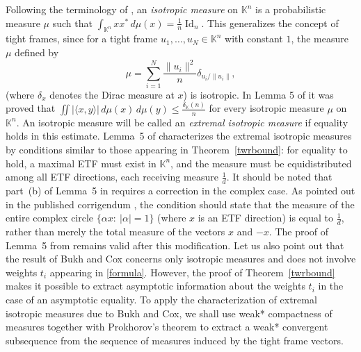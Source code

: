 \documentclass[12pt, reqno]{amsart}
\theoremstyle{definition}
\theoremstyle{remark}
\numberwithin{equation}{section}
\DeclareMathOperator{\id}{Id}
\begin{document}
Following the terminology of \cite{bukhcox}, an \emph{isotropic measure} on $\mathbb{K}^n$ is a probabilistic measure $\mu$ such that $\int_{\mathbb{K}^n} xx^* \,d\mu(x) = \frac{1}{n} \id_n$. This generalizes the concept of tight frames, since for a tight frame $u_1, \ldots, u_N \in \mathbb{K}^n$ with constant $1$, the measure $\mu$ defined by
$$\mu = \sum_{i=1}^{N} \frac{\|u_i\|^2}{n} \delta_{u_i/\|u_i\|},$$
(where $\delta_x$ denotes the Dirac measure at $x$) is isotropic. In Lemma 5 of \cite{bukhcox} it was proved that $\iint |\langle x,y\rangle| \,d\mu(x)\,d\mu(y) \leq \frac{\delta_{\mathbb{K}}(n)}{n}$ for every isotropic measure $\mu$ on $\mathbb{K}^n$. An isotropic measure will be called an \emph{extremal isotropic measure} if equality holds in this estimate. Lemma~5 of \cite{bukhcox} characterizes the extremal isotropic measures by conditions similar to those appearing in Theorem~\ref{twrbound}: for equality to hold, a maximal ETF must exist in $\mathbb K^n$, and the measure must be equidistributed among all ETF directions, each receiving measure $\frac1d$. It should be noted that part~(b) of Lemma~5 in \cite{bukhcox} requires a correction in the complex case. As pointed out in the published corrigendum \cite{bukhcoxcorr}, the condition should state that the measure of the entire complex circle $\{\alpha x:\ |\alpha|=1\}$ (where $x$ is an ETF direction) is equal to $\frac1d$, rather than merely the total measure of the vectors $x$ and $-x$. The proof of Lemma~5 from \cite{bukhcox} remains valid after this modification. Let us also point out that the result of Bukh and Cox concerns only isotropic measures and does not involve weights $t_i$ appearing in \eqref{formula}. However, the proof of Theorem~\ref{twrbound} makes it possible to extract asymptotic information about the weights $t_i$ in the case of an asymptotic equality. To apply the characterization of extremal isotropic measures due to Bukh and Cox, we shall use weak* compactness of measures together with Prokhorov's theorem to extract a weak* convergent subsequence from the sequence of measures induced by the tight frame vectors.
\end{document}
